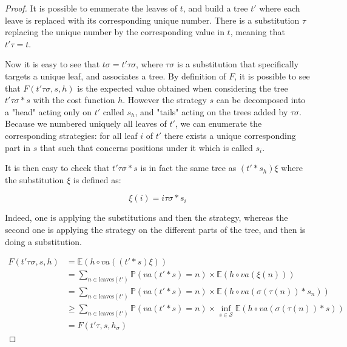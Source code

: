 \begin{proof}

    It is possible to enumerate the leaves of $t$, 
    and build a tree $t'$ where each leave is replaced 
    with its corresponding unique number. There is a substitution
    $\tau$ replacing the unique number by the corresponding value in $t$, 
    meaning that $t' \tau = t$.

    Now it is easy to see that $t \sigma = t' \tau \sigma$, where $\tau \sigma$
    is a substitution that specifically targets a unique leaf, and associates 
    a tree. By definition of $F$, it is possible to see that 
    $F (t' \tau \sigma, s, h)$ is the expected value obtained 
    when considering the tree $t' \tau \sigma * s$ with the cost function $h$. 
    However the strategy $s$ can be decomposed into a "head"
    acting only on $t'$ called $s_h$, and "tails" acting on the trees added by $\tau \sigma$. 
    Because we numbered uniquely all leaves of $t'$, we can enumerate the
    corresponding strategies: for all leaf $i$ of $t'$ there exists 
    a unique corresponding part in $s$ that such that concerns positions 
    under it which is called $s_i$.

    It is then easy to check that $t' \tau \sigma * s$ is in fact 
    the same tree as $(t' * s_h) \xi$ where the substitution $\xi$ is 
    defined as:

    \begin{equation*}
        \xi (i) = i \tau \sigma * s_i 
    \end{equation*}

    Indeed, one is applying the substitutions and then the strategy, 
    whereas the second one is applying the strategy on the different 
    parts of the tree, and then is doing a substitution.

    \begin{align*}
        F (t' \tau \sigma, s, h) &= 
        \mathbb{E} \left( h \circ va ((t' * s) \xi) \right)\\
        &= 
        \sum_{n \in \text{leaves}(t')} 
        \mathbb{P}( va(t' * s) = n ) \times \mathbb{E}\left( h \circ va (\xi
                                                        (n)) \right) \\
        &=
        \sum_{n \in \text{leaves}(t')} 
        \mathbb{P}( va(t' * s) = n ) \times \mathbb{E}\left( h \circ va (
        \sigma(\tau(n)) * s_n) \right) \\
        &\geq 
        \sum_{n \in \text{leaves}(t')} 
        \mathbb{P}( va(t' * s) = n ) \times \inf_{s \in \mathcal{S}} \mathbb{E}\left( h \circ va (
        \sigma(\tau(n)) * s) \right) \\
        &= 
        F (t' \tau, s, h_\sigma)
    \end{align*}


\end{proof}
